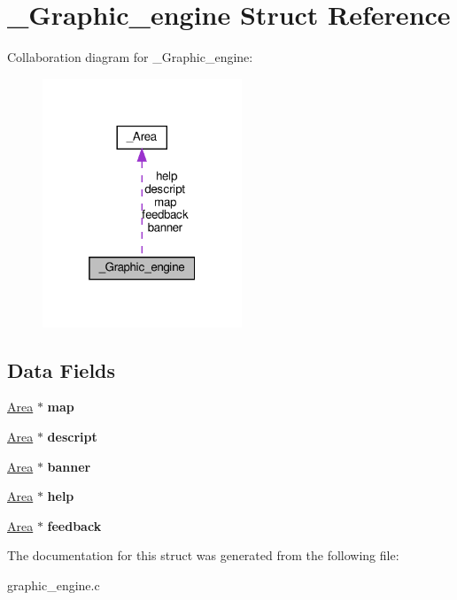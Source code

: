\hypertarget{struct__Graphic__engine}{}\section{\+\_\+\+Graphic\+\_\+engine Struct Reference}
\label{struct__Graphic__engine}


Collaboration diagram for \+\_\+\+Graphic\+\_\+engine\+:\nopagebreak
\begin{figure}[H]
\begin{center}
\leavevmode
\includegraphics[width=169pt]{struct__Graphic__engine__coll__graph}
\end{center}
\end{figure}
\subsection*{Data Fields}
\begin{DoxyCompactItemize}
\item 
\mbox{\label{struct__Graphic__engine_a1ea06bb881d335da8c31d63b3e834bdb}} 
\hyperlink{screen_8h_acfdfc42f6522d75fa3c16713afde8127}{Area} $\ast$ {\bfseries map}
\item 
\mbox{\label{struct__Graphic__engine_a8a4927aedd398b43f86c871f197edf1d}} 
\hyperlink{screen_8h_acfdfc42f6522d75fa3c16713afde8127}{Area} $\ast$ {\bfseries descript}
\item 
\mbox{\label{struct__Graphic__engine_a37d117af941b6aa825bb3dff24fe9e27}} 
\hyperlink{screen_8h_acfdfc42f6522d75fa3c16713afde8127}{Area} $\ast$ {\bfseries banner}
\item 
\mbox{\label{struct__Graphic__engine_a96833ee68d6330b61014979614f7fb77}} 
\hyperlink{screen_8h_acfdfc42f6522d75fa3c16713afde8127}{Area} $\ast$ {\bfseries help}
\item 
\mbox{\label{struct__Graphic__engine_aaae226ce3b87e512ec196f792ed2f552}} 
\hyperlink{screen_8h_acfdfc42f6522d75fa3c16713afde8127}{Area} $\ast$ {\bfseries feedback}
\end{DoxyCompactItemize}


The documentation for this struct was generated from the following file\+:\begin{DoxyCompactItemize}
\item 
graphic\+\_\+engine.\+c\end{DoxyCompactItemize}
